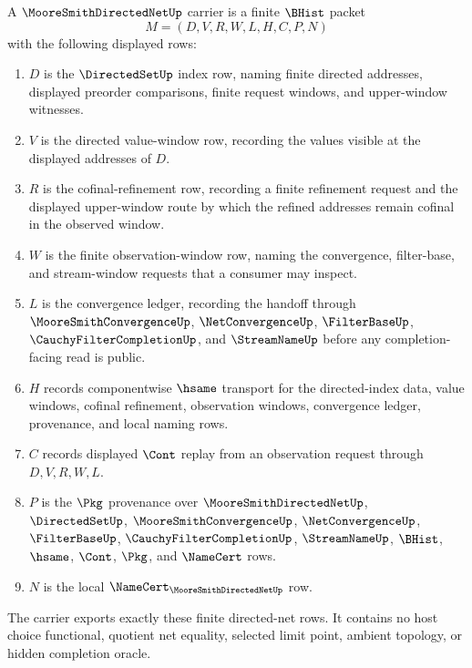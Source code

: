 \begin{definition}\label{def:moore-smith-directed-net-carrier}
A $\MooreSmithDirectedNetUp$ carrier is a finite $\BHist$ packet
$$
M=(D,V,R,W,L,H,C,P,N)
$$
with the following displayed rows:
\begin{enumerate}
\item $D$ is the $\DirectedSetUp$ index row, naming finite directed addresses, displayed preorder comparisons, finite request windows, and upper-window witnesses.
\item $V$ is the directed value-window row, recording the values visible at the displayed addresses of $D$.
\item $R$ is the cofinal-refinement row, recording a finite refinement request and the displayed upper-window route by which the refined addresses remain cofinal in the observed window.
\item $W$ is the finite observation-window row, naming the convergence, filter-base, and stream-window requests that a consumer may inspect.
\item $L$ is the convergence ledger, recording the handoff through $\MooreSmithConvergenceUp$, $\NetConvergenceUp$, $\FilterBaseUp$, $\CauchyFilterCompletionUp$, and $\StreamNameUp$ before any completion-facing read is public.
\item $H$ records componentwise $\hsame$ transport for the directed-index data, value windows, cofinal refinement, observation windows, convergence ledger, provenance, and local naming rows.
\item $C$ records displayed $\Cont$ replay from an observation request through $D,V,R,W,L$.
\item $P$ is the $\Pkg$ provenance over $\MooreSmithDirectedNetUp$, $\DirectedSetUp$, $\MooreSmithConvergenceUp$, $\NetConvergenceUp$, $\FilterBaseUp$, $\CauchyFilterCompletionUp$, $\StreamNameUp$, $\BHist$, $\hsame$, $\Cont$, $\Pkg$, and $\NameCert$ rows.
\item $N$ is the local $\NameCert_{\MooreSmithDirectedNetUp}$ row.
\end{enumerate}
The carrier exports exactly these finite directed-net rows. It contains no host choice functional, quotient net equality, selected limit point, ambient topology, or hidden completion oracle.
\end{definition}

